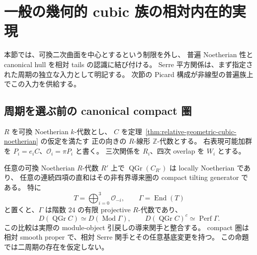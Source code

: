 \section{一般の幾何的 cubic 族の相対内在的実現}
\label{sec:relative-cubic-families}

本節では、可換二次曲面を中心とするという制限を外し、
普遍 Noetherian 性と canonical hull を相対 tails の認識に結び付ける。
Serre 平方関係は、まず指定された周期の独立な入力として明記する。
次節の Picard 構成が非線型の普遍族上でこの入力を供給する。

\subsection{周期を選ぶ前の canonical compact 圏}

$R$ を可換 Noetherian $k$-代数とし、
$C$ を定理~\ref{thm:relative-geometric-cubic-noetherian} の仮定を満たす
正の向きの $R$-線形 $\mathbb Z$-代数とする。
右表現可能加群を $P_i=e_iC$、$\mathcal O_i=\pi P_i$ と書く。
三次関係を $R_i$、四次 overlap を $W_i$ とする。

\begin{proposition}
\label{prop:general-cubic-canonical-tails}
任意の可換 Noetherian $R$-代数 $R'$ 上で
$\operatorname{QGr}(C_{R'})$ は locally Noetherian であり、
任意の連続四項の直和はその非有界導来圏の compact tilting generator である。
特に
\[
 T=\bigoplus_{i=0}^3\mathcal O_{-i},\qquad
 \Gamma=\operatorname{End}(T)
\]
と置くと、$\Gamma$ は階数 $24$ の有限 projective $R$-代数であり、
\[
 D(\operatorname{QGr}C)\simeq D(\operatorname{Mod}\Gamma),\qquad
 D(\operatorname{QGr}C)^c\simeq\operatorname{Perf}\Gamma.
 \tag{GC-Morita}\label{eq:general-cubic-canonical-morita}
\]
この比較は実際の module-object 引戻しの導来関手と整合する。
compact 圏は相対 smooth proper で、相対 Serre 関手とその任意基底変更を持つ。
この命題では二周期の存在を仮定しない。
\end{proposition}

